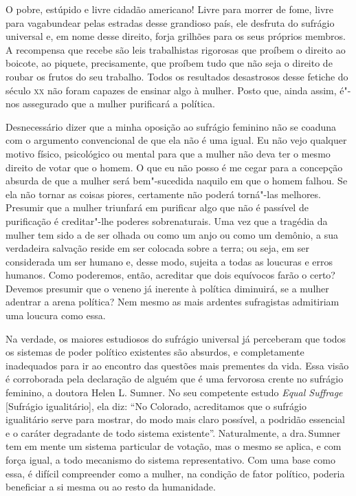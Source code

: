 O pobre, estúpido e livre cidadão americano! Livre para morrer de fome,
livre para vagabundear pelas estradas desse grandioso país, ele desfruta
do sufrágio universal e, em nome desse direito, forja grilhões para os seus
próprios membros. A recompensa que recebe são leis trabalhistas
rigorosas que proíbem o direito ao boicote, ao piquete, precisamente,
que proíbem tudo que não seja o direito de roubar os frutos do seu
trabalho. Todos os resultados desastrosos desse fetiche do século \textsc{xx} não
foram capazes de ensinar algo à mulher. Posto que, ainda assim, é"-nos assegurado que a mulher purificará a política.

Desnecessário dizer que a minha oposição ao sufrágio feminino não se
coaduna com o argumento convencional de que ela não é uma igual. Eu não
vejo qualquer motivo físico, psicológico ou mental para que a mulher não
deva ter o mesmo direito de votar que o homem. O que eu não posso é me
cegar para a concepção absurda de que a mulher será bem"-sucedida naquilo
em que o homem falhou. Se ela não tornar as coisas piores, certamente
não poderá torná"-las melhores. Presumir que a mulher triunfará em
purificar algo que não é passível de purificação é creditar"-lhe poderes
sobrenaturais. Uma vez que a tragédia da mulher tem sido a de ser olhada
ou como um anjo ou como um demônio, a sua verdadeira salvação reside em ser
colocada sobre a terra; ou seja, em ser considerada um ser humano e,
desse modo, sujeita a todas as loucuras e erros humanos. Como poderemos,
então, acreditar que dois equívocos farão o certo? Devemos presumir que
o veneno já inerente à política diminuirá, se a mulher adentrar a arena
política? Nem mesmo as mais ardentes sufragistas admitiriam uma loucura
como essa.

Na verdade, os maiores estudiosos do sufrágio universal já perceberam
que todos os sistemas de poder político existentes são absurdos, e
completamente inadequados para ir ao encontro das questões mais
prementes da vida. Essa visão é corroborada pela declaração de alguém
que é uma fervorosa crente no sufrágio feminino, a doutora Helen L.
Sumner. No seu competente estudo \emph{Equal Suffrage}
{[}Sufrágio igualitário{]}, ela diz: ``No Colorado, acreditamos que o
sufrágio igualitário serve para mostrar, do modo mais claro possível, a
podridão essencial e o caráter degradante de todo sistema existente''.
Naturalmente, a dra.\,Sumner tem em mente um sistema particular de
votação, mas o mesmo se aplica, e com força igual, a todo mecanismo do
sistema representativo. Com uma base como essa, é difícil compreender
como a mulher, na condição de fator político, poderia beneficiar a si
mesma ou ao resto da humanidade.

